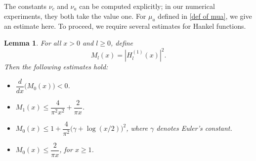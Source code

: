 \documentclass[12pt,reqno]{amsart}
\newtheorem{lem}[thm]{Lemma}
\begin{document}
The constants $\nu_c$ and $\nu_a$ can be computed explicitly; in our numerical experiments, they both take the value one. For $\mu_a$ defined in \eqref{def of mua}, we give an estimate here. To proceed, we require several estimates for Hankel functions. 
\begin{lem}\cite{freitasSharpBoundsModulus2018}
     For all $x>0$ and $l\geq 0$, define
     \begin{equation*}
        M_l(x) = |H^{(1)}_l(x)|^2.
     \end{equation*}
     Then the following estimates hold:
     \begin{itemize}
         \item $\dfrac{d}{dx}\big(M_0(x)\big)<0$.
         \item $M_1(x)\leq\dfrac{4}{\pi^2 x^{2}}+\dfrac{2}{\pi x}$.
         \item $M_0(x)\leq 1+\dfrac{4}{\pi^2}\big(\gamma+\log (x / 2)\big)^2$, where $\gamma$ denotes Euler’s constant.
         \item $M_0(x)\leq \dfrac{2}{\pi x}$, for $x\geq 1$.
     \end{itemize}
\end{lem}
\end{document}
